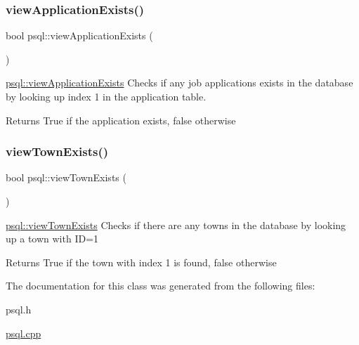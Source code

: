 \subsubsection{\texorpdfstring{view\+Application\+Exists()}{viewApplicationExists()}}
{\footnotesize\ttfamily bool psql\+::view\+Application\+Exists (\begin{DoxyParamCaption}{ }\end{DoxyParamCaption})}



\mbox{\hyperlink{classpsql_a4c23d467c41e155a55c38b1cefb9b54b}{psql\+::view\+Application\+Exists}} Checks if any job applications exists in the database by looking up index 1 in the application table. 

\begin{DoxyReturn}{Returns}
True if the application exists, false otherwise 
\end{DoxyReturn}
\mbox{\label{classpsql_aae95eb2a505c1b0b7b4d5671926ecd2f}} 
\subsubsection{\texorpdfstring{view\+Town\+Exists()}{viewTownExists()}}
{\footnotesize\ttfamily bool psql\+::view\+Town\+Exists (\begin{DoxyParamCaption}{ }\end{DoxyParamCaption})}



\mbox{\hyperlink{classpsql_aae95eb2a505c1b0b7b4d5671926ecd2f}{psql\+::view\+Town\+Exists}} Checks if there are any towns in the database by looking up a town with ID=1 

\begin{DoxyReturn}{Returns}
True if the town with index 1 is found, false otherwise 
\end{DoxyReturn}


The documentation for this class was generated from the following files\+:\begin{DoxyCompactItemize}
\item 
psql.\+h\item 
\mbox{\hyperlink{psql_8cpp}{psql.\+cpp}}\end{DoxyCompactItemize}
